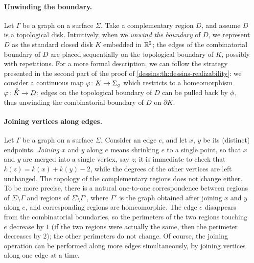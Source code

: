 \paragraph{Unwinding the boundary.} Let $\Gamma$ be a graph on a surface $\Sigma$. Take a complementary region $D$, and assume $D$ is a topological disk. Intuitively, when we \emph{unwind the boundary} of $D$, we represent $D$ as the standard closed disk $K$ embedded in $\mathbb{R}^2$; the edges of the combinatorial boundary of $D$ are placed sequentially on the topological boundary of $K$, possibly with repetitions. For a more formal description, we can follow the strategy presented in the second part of the proof of \cref{dessins:th:dessins-realizability}: we consider a continuous map $\map{\phi}{K}{\surf{g}}$ which restricts to a homeomorphism $\map{\phi}{\interior{K}}{D}$; edges on the topological boundary of $D$ can be pulled back by $\phi$, thus unwinding the combinatorial boundary of $D$ on $\partial K$.

\paragraph{Joining vertices along edges.} Let $\Gamma$ be a graph on a surface $\Sigma$. Consider an edge $e$, and let $x$, $y$ be its (distinct) endpoints. \emph{Joining} $x$ and $y$ along $e$ means shrinking $e$ to a single point, so that $x$ and $y$ are merged into a single vertex, say $z$; it is immediate to check that $k(z)=k(x)+k(y)-2$, while the degrees of the other vertices are left unchanged. The topology of the complementary regions does not change either. To be more precise, there is a natural one-to-one correspondence between regions of $\Sigma\setminus\Gamma$ and regions of $\Sigma\setminus\Gamma'$, where $\Gamma'$ is the graph obtained after joining $x$ and $y$ along $e$, and corresponding regions are homeomorphic. The edge $e$ disappears from the combinatorial boundaries, so the perimeters of the two regions touching $e$ decrease by $1$ (if the two regions were actually the same, then the perimeter decreases by $2$); the other perimeters do not change. Of course, the joining operation can be performed along more edges simultaneously, by joining vertices along one edge at a time.

